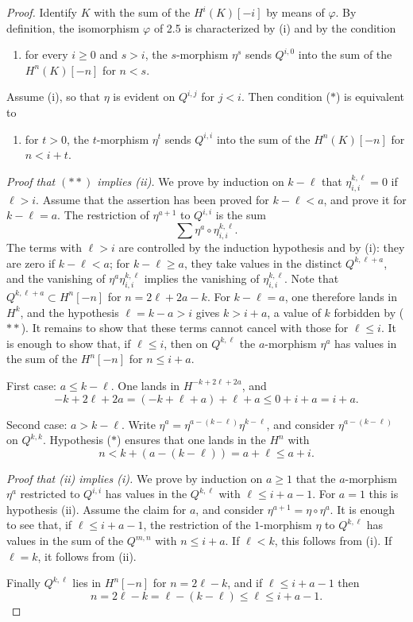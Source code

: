 \documentclass[11pt,a4paper]{article}
\theoremstyle{plain}
\theoremstyle{definition}
\theoremstyle{remark}
\begin{document}
\begin{proof}
Identify $K$ with the sum of the $H^i(K)[-i]$ by means of $\varphi$. By definition, the isomorphism $\varphi$ of 2.5 is characterized by (i) and by the condition
\begin{enumerate}[label=($*$)]
\item for every $i\geqslant0$ and $s>i$, the $s$-morphism $\eta^s$ sends $Q^{i,0}$ into the sum of the $H^n(K)[-n]$ for $n<s$.
\end{enumerate}
Assume (i), so that $\eta$ is evident on $Q^{i,j}$ for $j<i$. Then condition ($*$) is equivalent to
\begin{enumerate}[label=($**$)]
\item for $t>0$, the $t$-morphism $\eta^t$ sends $Q^{i,i}$ into the sum of the $H^n(K)[-n]$ for $n<i+t$.
\end{enumerate}

\emph{Proof that $(**)$ implies (ii).} We prove by induction on $k-\ell$ that $\eta^{k,\ell}_{i,i}=0$ if $\ell>i$. Assume that the assertion has been proved for $k-\ell<a$, and prove it for $k-\ell=a$. The restriction of $\eta^{a+1}$ to $Q^{i,i}$ is the sum
\[
\sum \eta^a\circ\eta^{k,\ell}_{i,i}.
\]
The terms with $\ell>i$ are controlled by the induction hypothesis and by (i): they are zero if $k-\ell<a$; for $k-\ell\geqslant a$, they take values in the distinct $Q^{k,\ell+a}$, and the vanishing of $\eta^a\eta^{k,\ell}_{i,i}$ implies the vanishing of $\eta^{k,\ell}_{i,i}$. Note that $Q^{k,\ell+a}\subset H^n[-n]$ for $n=2\ell+2a-k$. For $k-\ell=a$, one therefore lands in $H^k$, and the hypothesis $\ell=k-a>i$ gives $k>i+a$, a value of $k$ forbidden by ($**$). It remains to show that these terms cannot cancel with those for $\ell\leqslant i$. It is enough to show that, if $\ell\leqslant i$, then on $Q^{k,\ell}$ the $a$-morphism $\eta^a$ has values in the sum of the $H^n[-n]$ for $n\leqslant i+a$.

First case: $a\leqslant k-\ell$. One lands in $H^{-k+2\ell+2a}$, and
\[
-k+2\ell+2a=(-k+\ell+a)+\ell+a\leqslant0+i+a=i+a.
\]

Second case: $a>k-\ell$. Write $\eta^a=\eta^{a-(k-\ell)}\eta^{k-\ell}$, and consider $\eta^{a-(k-\ell)}$ on $Q^{k,k}$. Hypothesis ($*$) ensures that one lands in the $H^n$ with
\[
n< k+(a-(k-\ell))=a+\ell\leqslant a+i.
\]

\emph{Proof that (ii) implies (i).} We prove by induction on $a\geqslant1$ that the $a$-morphism $\eta^a$ restricted to $Q^{i,i}$ has values in the $Q^{k,\ell}$ with $\ell\leqslant i+a-1$. For $a=1$ this is hypothesis (ii). Assume the claim for $a$, and consider $\eta^{a+1}=\eta\circ\eta^a$. It is enough to see that, if $\ell\leqslant i+a-1$, the restriction of the $1$-morphism $\eta$ to $Q^{k,\ell}$ has values in the sum of the $Q^{m,n}$ with $n\leqslant i+a$. If $\ell<k$, this follows from (i). If $\ell=k$, it follows from (ii).

Finally $Q^{k,\ell}$ lies in $H^n[-n]$ for $n=2\ell-k$, and if $\ell\leqslant i+a-1$ then
\[
n=2\ell-k=\ell-(k-\ell)\leqslant\ell\leqslant i+a-1.
\]
\end{proof}
\end{document}
